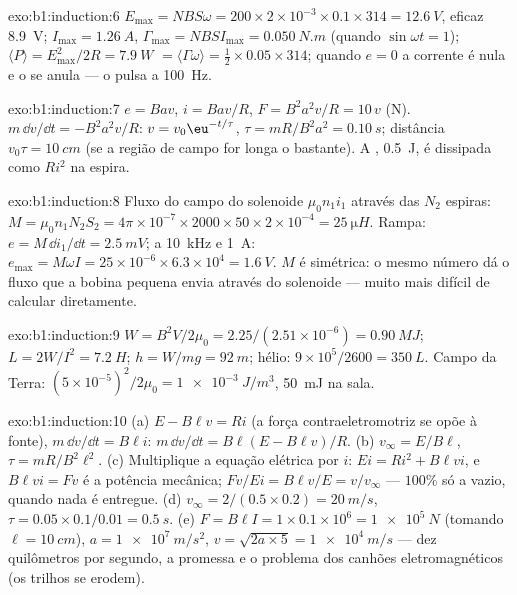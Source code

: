 \begin{solution}{exo:b1:induction:6}
$E_{\max} = NBS\omega = 200 \times 2 \times 10^{-3} \times 0.1 \times 314 = \qty{12.6}{V}$, eficaz
\qty{8.9}{V}; $I_{\max} = \qty{1.26}{A}$, $\Gamma_{\max} = NBSI_{\max} = \qty{0.050}{N.m}$
(quando $\sin\omega t = 1$); $\langle P\rangle = E_{\max}^2/2R = \qty{7.9}{W}$ $=
\langle\Gamma\omega\rangle = \tfrac12 \times 0.05 \times 314$; quando $e = 0$ a corrente é
nula e o  se anula --- o  pulsa a \qty{100}{Hz}.
\end{solution}

\begin{solution}{exo:b1:induction:7}
$e = Bav$, $i = Bav/R$, $F = B^2a^2v/R = 10\,v$ (N). $m\,\dd v/\dd t = -B^2a^2v/R$:
$v = v_0\eu^{-t/\tau}$, $\tau = mR/B^2a^2 = \qty{0.10}{s}$; distância $v_0\tau =
\qty{10}{cm}$ (se a região de campo for longa o bastante). A ,
\qty{0.5}{J}, é dissipada como $Ri^2$ na espira.
\end{solution}

\begin{solution}{exo:b1:induction:8}
Fluxo do campo do solenoide $\mu_0n_1i_1$ através das $N_2$ espiras: $M =
\mu_0n_1N_2S_2 = 4\pi \times 10^{-7} \times 2000 \times 50 \times 2 \times 10^{-4} = \qty{25}{\micro H}$.
Rampa: $e = M\,\dd i_1/\dd t = \qty{2.5}{mV}$; a \qty{10}{kHz} e \qty{1}{A}: $e_{\max} =
M\omega I = 25 \times 10^{-6} \times 6.3 \times 10^4 = \qty{1.6}{V}$. $M$ é simétrica:
o mesmo número dá o fluxo que a bobina pequena envia através do
solenoide --- muito mais difícil de calcular diretamente.
\end{solution}

\begin{solution}{exo:b1:induction:9}
$W = B^2V/2\mu_0 = 2.25/(2.51 \times 10^{-6}) = \qty{0.90}{MJ}$; $L = 2W/I^2 =
\qty{7.2}{H}$; $h = W/mg = \qty{92}{m}$; hélio: $9 \times 10^5/2600 = \qty{350}{L}$.
Campo da Terra: $(5 \times 10^{-5})^2/2\mu_0 = \qty{1e-3}{J/m^3}$, \qty{50}{mJ} na
sala.
\end{solution}

\begin{solution}{exo:b1:induction:10}
(a) $E - B\ell v = Ri$ (a força contraeletromotriz se opõe à fonte), $m\,\dd v/\dd t =
B\ell i$: $m\,\dd v/\dd t = B\ell(E - B\ell v)/R$. (b) $v_\infty = E/B\ell$, $\tau =
mR/B^2\ell^2$. (c) Multiplique a equação elétrica por $i$: $Ei = Ri^2 +
B\ell vi$, e $B\ell vi = Fv$ é a potência mecânica;  $Fv/Ei =
B\ell v/E = v/v_\infty$ --- $100\%$ só a vazio, quando nada é
entregue. (d) $v_\infty = 2/(0.5 \times 0.2) = \qty{20}{m/s}$, $\tau = 0.05 \times
0.1/0.01 = \qty{0.5}{s}$. (e) $F = B\ell I = 1 \times 0.1 \times 10^6 = \qty{1e5}{N}$
(tomando $\ell = \qty{10}{cm}$), $a = \qty{1e7}{m/s^2}$, $v = \sqrt{2a \times 5} =
\qty{1e4}{m/s}$ --- dez quilômetros por segundo, a promessa e o
problema dos canhões eletromagnéticos (os trilhos se erodem).
\end{solution}

